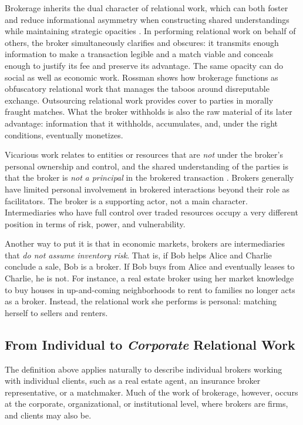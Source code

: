 \documentclass[
]{article}
\begin{document}
Brokerage inherits the dual character of relational work, which can both foster and reduce informational asymmetry when constructing shared understandings while maintaining strategic opacities \autocite[138]{blockRelationalWorkMarket2012}. In performing relational work on behalf of others, the broker simultaneously clarifies and obscures: it transmits enough information to make a transaction legible and a match viable and conceals enough to justify its fee and preserve its advantage. The same opacity can do social as well as economic work. Rossman \autocite*{rossmanObfuscatoryRelationalWork2014} shows how brokerage functions as obfuscatory relational work that manages the taboos around disreputable exchange. Outsourcing relational work provides cover to parties in morally fraught matches. What the broker withholds is also the raw material of its later advantage: information that it withholds, accumulates, and, under the right conditions, eventually monetizes.

Vicarious work relates to entities or resources that are \emph{not} under the broker's personal ownership and control, and the shared understanding of the parties is that the broker is \emph{not} \emph{a principal} in the brokered transaction \autocite[see, e.g.][21326]{stovelStabilizingBrokerage2011}. Brokers generally have limited personal involvement in brokered interactions beyond their role as facilitators. The broker is a supporting actor, not a main character. Intermediaries who have full control over traded resources occupy a very different position in terms of risk, power, and vulnerability.

Another way to put it is that in economic markets, brokers are intermediaries that \emph{do not assume inventory risk}. That is, if Bob helps Alice and Charlie conclude a sale, Bob is a broker. If Bob buys from Alice and eventually leases to Charlie, he is not. For instance, a real estate broker using her market knowledge to buy houses in up-and-coming neighborhoods to rent to families no longer acts as a broker. Instead, the relational work she performs is personal: matching herself to sellers and renters.

\subsection{\texorpdfstring{From Individual to \emph{Corporate} Relational Work}{From Individual to Corporate Relational Work}}

The definition above applies naturally to describe individual brokers working with individual clients, such as a real estate agent, an insurance broker representative, or a matchmaker. Much of the work of brokerage, however, occurs at the corporate, organizational, or institutional level, where brokers are firms, and clients may also be.
\end{document}
